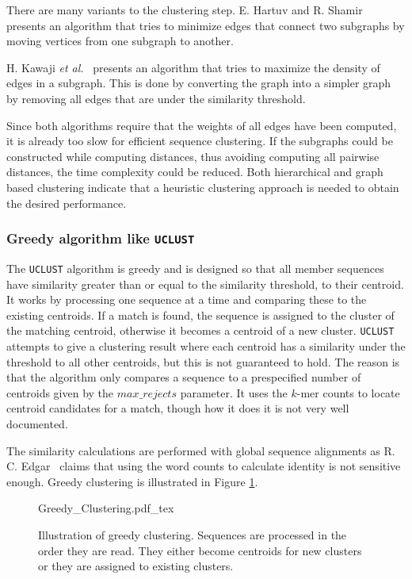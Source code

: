 There are many variants to the clustering step. E. Hartuv and R. Shamir \\
\cite{hartuv} presents an algorithm that tries to minimize edges that
connect two subgraphs by moving vertices from one subgraph to another.

H. Kawaji \textit{et al.}~\cite{kawaji} presents an algorithm that tries to
maximize the density of edges in a subgraph. This is done by converting the
graph into a simpler graph by removing all edges that are under the similarity
threshold.

Since both algorithms require that the weights of all edges have been computed,
it is already too slow for efficient sequence clustering. If the subgraphs
could be constructed while computing distances, thus avoiding computing all
pairwise distances, the time complexity could be reduced. Both hierarchical and
graph based clustering indicate that a heuristic clustering approach is needed
to obtain the desired performance.


\subsubsection{Greedy algorithm like \texttt{UCLUST}}

The \texttt{UCLUST} algorithm is greedy and is designed so that all member
sequences have similarity greater than or equal to the similarity threshold,
to their centroid.  It works by processing one sequence at a time and
comparing these to the existing centroids. If a match is found, the sequence
is assigned to the cluster of the matching centroid, otherwise it becomes a
centroid of a new cluster. \texttt{UCLUST} attempts to give a clustering
result where each centroid has a similarity under the threshold to all other
centroids, but this is not guaranteed to hold. The reason is that the
algorithm only compares a sequence to a prespecified number of centroids given
by the $max\_rejects$ parameter. It uses the $k$-mer counts to locate centroid
candidates for a match, though how it does it is not very well documented.

The similarity calculations are performed with global sequence alignments as R.
C. Edgar~\cite{usearch_algorithm}  claims that using the word counts to
calculate identity is not sensitive enough. Greedy clustering is illustrated in
Figure \ref{fig:greedy_clustering}.

\begin{figure}[H]
  \def\svgwidth{\columnwidth}
  {Greedy_Clustering.pdf_tex}
  \caption{Illustration of greedy clustering. Sequences are processed in the
    order they are read. They either become centroids for new clusters or they
    are assigned to existing clusters.}
  \label{fig:greedy_clustering}
\end{figure}

